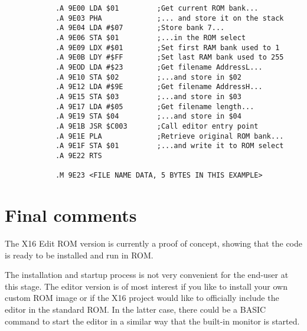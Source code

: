 \documentclass{article}
\begin{document}
        \begin{verbatim}
            .A 9E00 LDA $01         ;Get current ROM bank...
            .A 9E03 PHA             ;... and store it on the stack
            .A 9E04 LDA #$07        ;Store bank 7...
            .A 9E06 STA $01         ;...in the ROM select
            .A 9E09 LDX #$01        ;Set first RAM bank used to 1
            .A 9E0B LDY #$FF        ;Set last RAM bank used to 255
            .A 9EOD LDA #$23        ;Get filename AddressL...
            .A 9E10 STA $02         ;...and store in $02
            .A 9E12 LDA #$9E        ;Get filename AddressH...
            .A 9E15 STA $03         ;...and store in $03
            .A 9E17 LDA #$05        ;Get filename length...
            .A 9E19 STA $04         ;...and store in $04
            .A 9E1B JSR $C003       ;Call editor entry point
            .A 9E1E PLA             ;Retrieve original ROM bank...
            .A 9E1F STA $01         ;...and write it to ROM select
            .A 9E22 RTS

            .M 9E23 <FILE NAME DATA, 5 BYTES IN THIS EXAMPLE>
        \end{verbatim}    


\section{Final comments}

    The X16 Edit ROM version is currently a proof of concept, showing that the code is ready to be installed and run in ROM.
    
    The installation and startup process is not very convenient for the end-user at this stage. The editor version is of most
    interest if you like to install your own custom ROM image or if the X16 project would like to officially include the
    editor in the standard ROM. In the latter case, there could be a BASIC command to start the editor in a similar way
    that the built-in monitor is started.
\end{document}
